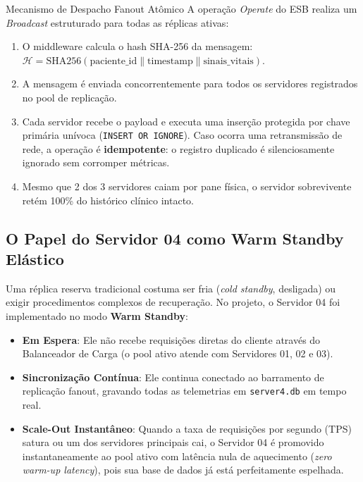 \documentclass[11pt,a4paper]{article}
\begin{document}
\begin{conceito}{Mecanismo de Despacho Fanout Atômico}
A operação \textit{Operate} do ESB realiza um \textit{Broadcast} estruturado para todas as réplicas ativas:
\begin{enumerate}
    \item O middleware calcula o hash SHA-256 da mensagem: $\mathcal{H} = \text{SHA256}(\text{paciente\_id} \parallel \text{timestamp} \parallel \text{sinais\_vitais})$.
    \item A mensagem é enviada concorrentemente para todos os servidores registrados no pool de replicação.
    \item Cada servidor recebe o payload e executa uma inserção protegida por chave primária unívoca (\texttt{INSERT OR IGNORE}). Caso ocorra uma retransmissão de rede, a operação é \textbf{idempotente}: o registro duplicado é silenciosamente ignorado sem corromper métricas.
    \item Mesmo que 2 dos 3 servidores caiam por pane física, o servidor sobrevivente retém 100\% do histórico clínico intacto.
\end{enumerate}
\end{conceito}

\subsection{O Papel do Servidor 04 como Warm Standby Elástico}
Uma réplica reserva tradicional costuma ser fria (\textit{cold standby}, desligada) ou exigir procedimentos complexos de recuperação. No projeto, o Servidor 04 foi implementado no modo \textbf{Warm Standby}:
\begin{itemize}
    \item \textbf{Em Espera}: Ele não recebe requisições diretas do cliente através do Balanceador de Carga (o pool ativo atende com Servidores 01, 02 e 03).
    \item \textbf{Sincronização Contínua}: Ele continua conectado ao barramento de replicação fanout, gravando todas as telemetrias em \texttt{server4.db} em tempo real.
    \item \textbf{Scale-Out Instantâneo}: Quando a taxa de requisições por segundo (TPS) satura ou um dos servidores principais cai, o Servidor 04 é promovido instantaneamente ao pool ativo com latência nula de aquecimento (\textit{zero warm-up latency}), pois sua base de dados já está perfeitamente espelhada.
\end{itemize}

\end{document}
